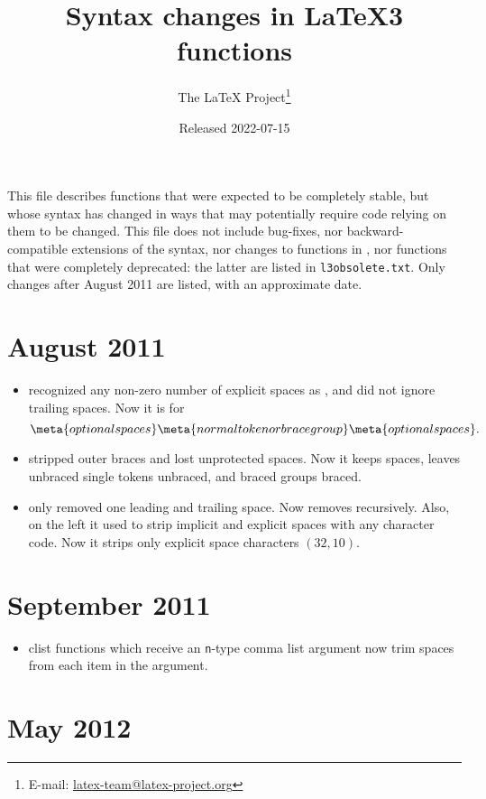 \documentclass{l3doc}
\title{%
  Syntax changes in \LaTeX3 functions%
}
\author{%
  The \LaTeX{} Project\thanks
    {%
      E-mail:
      \href{mailto:latex-team@latex-project.org}%
        {latex-team@latex-project.org}%
    }%
}
\date{Released 2022-07-15}
\newcommand{\TF}{\textit{(TF)}}
\begin{document}
\maketitle

This file describes functions that were expected to be completely
stable, but whose syntax has changed in ways that may potentially
require code relying on them to be changed.  This file does not include
bug-fixes, nor backward-compatible extensions of the syntax, nor changes
to functions in , nor functions that were completely
deprecated: the latter are listed in \texttt{l3obsolete.txt}.  Only
changes after August 2011 are listed, with an approximate date.

\section{August 2011}

\begin{itemize}
  \item \cs{tl_if_single:n\TF} recognized any non-zero number of
    explicit spaces as , and did not ignore trailing spaces.
    Now it is  for
    \[
      \meta{optional spaces}
      \meta{normal token or brace group}
      \meta{optional spaces}.
    \]
  \item {} stripped outer braces and lost unprotected spaces.
    Now it keeps spaces, leaves unbraced single tokens unbraced, and
    braced groups braced.
  \item {} only removed one leading and trailing space.
    Now removes recursively. Also, on the left it used to strip implicit
    and explicit spaces with any character code. Now it strips only explicit
    space characters $(32,10)$.
\end{itemize}

\section{September 2011}

\begin{itemize}
\item clist functions which receive an \texttt{n}-type comma list argument
  now trim spaces from each item in the argument.
\end{itemize}

\section{May 2012}
\end{document}
